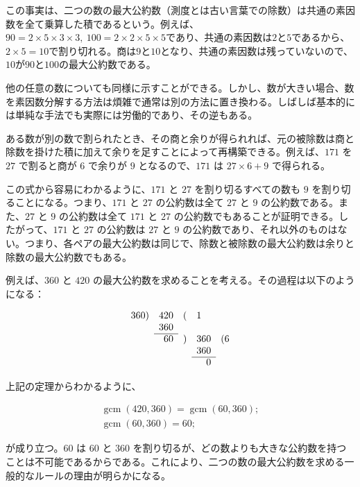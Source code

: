 \documentclass[a4paper,11pt,openany]{ltjsbook}
\newcommand{\Strut}[1][1em]{\rule[-0.3#1]{0pt}{#1}}
\newcommand{\gcm}{\operatorname{gcm}}
\newcommand{\Z}{\phantom{0}}
\begin{document}
この事実は、二つの数の最大公約数（測度とは古い言葉での除数）は共通の素因数を全て乗算した積であるという。例えば、$90 = 2 \times 5 \times 3 \times 3,~100 = 2 \times 2 \times 5 \times 5$であり、共通の素因数は$2$と$5$であるから、$2 \times 5 = 10$で割り切れる。商は$9$と$10$となり、共通の素因数は残っていないので、$10$が$90$と$100$の最大公約数である。

他の任意の数についても同様に示すことができる。しかし、数が大きい場合、数を素因数分解する方法は煩雑で通常は別の方法に置き換わる。しばしば基本的には単純な手法でも実際には労働的であり、その逆もある。

ある数が別の数で割られたとき、その商と余りが得られれば、元の被除数は商と除数を掛けた積に加えて余りを足すことによって再構築できる。例えば、$171$ を $27$ で割ると商が $6$ で余りが $9$ となるので、$171$ は $27 \times 6 + 9$ で得られる。

この式から容易にわかるように、$171$ と $27$ を割り切るすべての数も $9$ を割り切ることになる。つまり、$171$ と $27$ の公約数は全て $27$ と $9$ の公約数である。また、$27$ と $9$ の公約数は全て $171$ と $27$ の公約数でもあることが証明できる。したがって、$171$ と $27$ の公約数は $27$ と $9$ の公約数であり、それ以外のものはない。つまり、各ペアの最大公約数は同じで、除数と被除数の最大公約数は余りと除数の最大公約数でもある。

例えば、$360$ と $420$ の最大公約数を求めることを考える。その過程は以下のようになる：

\[
\begin{array}{rrcrl}
360) & 420 &(& 1\Z\Z \\
     & 360 \\
\cline{2-2}
\Strut
     &  60 &)& 360 & (6 \\
     &     & & 360 \\
\cline{4-4}
\Strut
     &     & &   0
\end{array}
\]

上記の定理からわかるように、

\begin{gather*}
\gcm(420, 360) = \gcm(60, 360); \\
\gcm(60, 360) = 60;
\end{gather*}

が成り立つ。$60$ は $60$ と $360$ を割り切るが、どの数よりも大きな公約数を持つことは不可能であるからである。これにより、二つの数の最大公約数を求める一般的なルールの理由が明らかになる。
\end{document}
